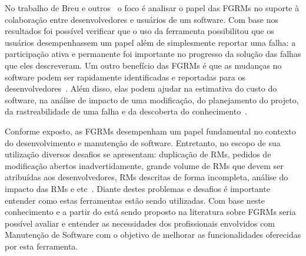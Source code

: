 No trabalho de Breu e outros~\cite{Breu:2010:INB:1718918.1718973} o foco é
analisar o papel das FGRMs no suporte à colaboração entre desenvolvedores e
usuários de um software. Com base nos resultados foi possível verificar que o
uso da ferramenta possibilitou que os usuários desempenhassem um papel além de
simplesmente reportar uma falha: a participação ativa e permanente foi
importante no progresso da solução das falhas que eles descreveram. Um outro
benefício das FGRMs é que as mudanças no software podem ser rapidamente
identificadas e reportadas para os desenvolvedores~\cite{anvik2005coping}. Além
disso, elas podem ajudar na estimativa do custo do software, na análise de
impacto de uma modificação, do planejamento do projeto, da rastreabilidade de
uma falha e da descoberta do conhecimento~\cite{cavalcanti2013bug}.

Conforme exposto, as FGRMs desempenham um papel fundamental no contexto do
desenvolvimento e manutenção de software. Entretanto, no escopo de sua
utilização diversos desafios se apresentam: duplicação de RMs, pedidos de
modificação abertos inadvertidamente, grande volume de RMs que devem ser
atribuídas aos desenvolvedores, RMs descritas de forma incompleta, análise do
impacto das RMs e etc~\cite{cavalcanti2014challenges}. Diante destes problemas e
desafios é importante entender como estas ferramentas estão sendo utilizadas.
Com base neste conhecimento e a partir do está sendo proposto na literatura
sobre FGRMs seria possível avaliar e entender as necessidades dos profissionais
envolvidos com Manutenção de Software com o objetivo de melhorar as
funcionalidades oferecidas por esta ferramenta.

